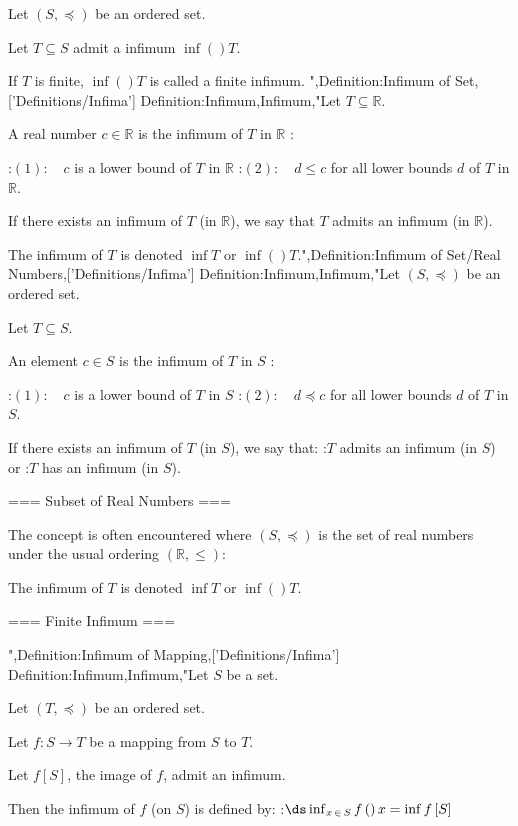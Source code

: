 Let $\left( S, \preccurlyeq \right)$ be an ordered set.

Let $T \subseteq S$ admit a infimum $\inf \left(   \right)T$.


If $T$ is finite, $\inf \left(   \right)T$ is called a finite infimum.
",Definition:Infimum of Set,['Definitions/Infima']
Definition:Infimum,Infimum,"Let $T \subseteq \mathbb R$.


A real number $c \in \mathbb R$ is the infimum of $T$ in $\mathbb R$ :

:$(1): \quad c$ is a lower bound of $T$ in $\mathbb R$
:$(2): \quad d \le c$ for all lower bounds $d$ of $T$ in $\mathbb R$.


If there exists an infimum of $T$ (in $\mathbb R$), we say that $T$ admits an infimum (in $\mathbb R$).


The infimum of $T$ is denoted $\inf T$ or $\inf \left(   \right)T$.",Definition:Infimum of Set/Real Numbers,['Definitions/Infima']
Definition:Infimum,Infimum,"Let $\left( S, \preccurlyeq \right)$ be an ordered set.

Let $T \subseteq S$.


An element $c \in S$ is the infimum of $T$ in $S$ :

:$(1): \quad c$ is a lower bound of $T$ in $S$
:$(2): \quad d \preccurlyeq c$ for all lower bounds $d$ of $T$ in $S$.


If there exists an infimum of $T$ (in $S$), we say that:
:$T$ admits an infimum (in $S$) or
:$T$ has an infimum (in $S$).


=== Subset of Real Numbers ===

The concept is often encountered where $\left( S, \preccurlyeq \right)$ is the set of real numbers under the usual ordering $\left( \mathbb R, \le \right)$:



The infimum of $T$ is denoted $\inf T$ or $\inf \left(   \right)T$.


=== Finite Infimum ===

",Definition:Infimum of Mapping,['Definitions/Infima']
Definition:Infimum,Infimum,"Let $S$ be a set.

Let $\left( T, \preceq \right)$ be an ordered set.

Let $f: S \to T$ be a mapping from $S$ to $T$.

Let $f \left[ S \right]$, the image of $f$, admit an infimum.


Then the infimum of $f$ (on $S$) is defined by:
:$\ds \inf_{x \mathop \in S} f \left(   \right)x = \inf f \left[ S \right]$


